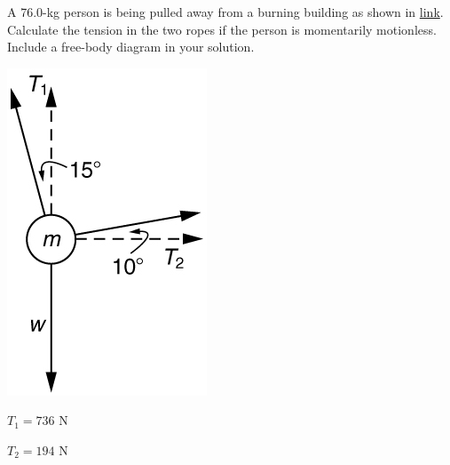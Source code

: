 \documentclass[
]{book}
\newenvironment{problems-exercises}{}{}
\begin{document}
\begin{problems-exercises}
\hypertarget{fs-id2953749}{}
\leavevmode\hypertarget{fs-id2401285}{}%
A 76.0-kg person is being pulled away from a burning building as shown
in \protect\hyperlink{import-auto-id2677556}{link}. Calculate the
tension in the two ropes if the person is momentarily motionless.
Include a free-body diagram in your solution.

\leavevmode\hypertarget{fs-id2653393}{}%
\includegraphics{images/Figure_04_07_07.jpg}

\(T_{1} = \text{736\ N}\)

\({T_{2} = \text{194\ N}}{}\)


\end{problems-exercises}
\end{document}
